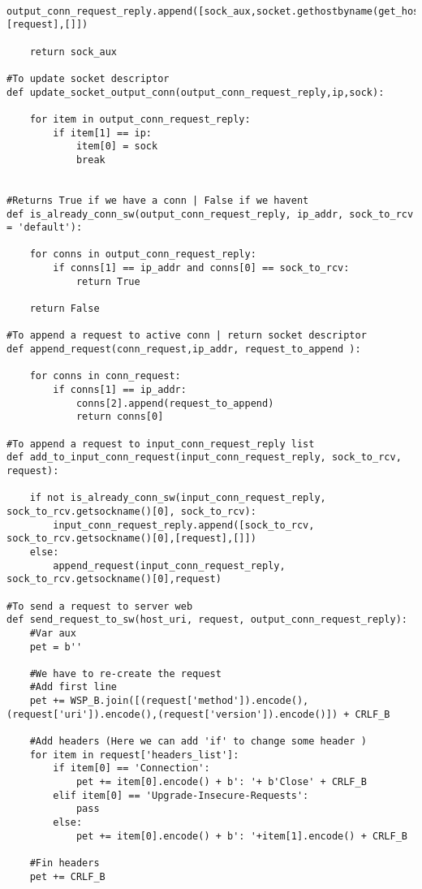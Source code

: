 \begin{verbatim}
    output_conn_request_reply.append([sock_aux,socket.gethostbyname(get_host_from_header_list(request['headers_list'])),[request],[]])

    return sock_aux

#To update socket descriptor
def update_socket_output_conn(output_conn_request_reply,ip,sock):

    for item in output_conn_request_reply:
        if item[1] == ip:
            item[0] = sock
            break


#Returns True if we have a conn | False if we havent
def is_already_conn_sw(output_conn_request_reply, ip_addr, sock_to_rcv = 'default'):

    for conns in output_conn_request_reply:
        if conns[1] == ip_addr and conns[0] == sock_to_rcv:
            return True

    return False

#To append a request to active conn | return socket descriptor
def append_request(conn_request,ip_addr, request_to_append ):

    for conns in conn_request:
        if conns[1] == ip_addr:
            conns[2].append(request_to_append)
            return conns[0]

#To append a request to input_conn_request_reply list           
def add_to_input_conn_request(input_conn_request_reply, sock_to_rcv, request):

    if not is_already_conn_sw(input_conn_request_reply, sock_to_rcv.getsockname()[0], sock_to_rcv):
        input_conn_request_reply.append([sock_to_rcv, sock_to_rcv.getsockname()[0],[request],[]])
    else:
        append_request(input_conn_request_reply, sock_to_rcv.getsockname()[0],request)

#To send a request to server web 
def send_request_to_sw(host_uri, request, output_conn_request_reply):
    #Var aux
    pet = b''

    #We have to re-create the request
    #Add first line 
    pet += WSP_B.join([(request['method']).encode(),(request['uri']).encode(),(request['version']).encode()]) + CRLF_B

    #Add headers (Here we can add 'if' to change some header )
    for item in request['headers_list']:
        if item[0] == 'Connection':
            pet += item[0].encode() + b': '+ b'Close' + CRLF_B
        elif item[0] == 'Upgrade-Insecure-Requests':
            pass
        else:
            pet += item[0].encode() + b': '+item[1].encode() + CRLF_B 

    #Fin headers
    pet += CRLF_B


\end{verbatim}
